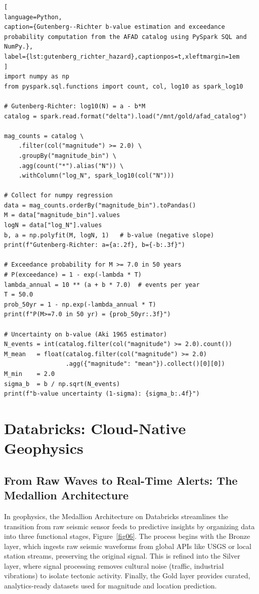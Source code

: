 \documentclass[data,article,accept,pdftex,moreauthors]{Definitions/mdpi}
\begin{document}

\begin{lstlisting}[
language=Python,
caption={Gutenberg--Richter b-value estimation and exceedance probability computation from the AFAD catalog using PySpark SQL and NumPy.},
label={lst:gutenberg_richter_hazard},captionpos=t,xleftmargin=1em
]
import numpy as np
from pyspark.sql.functions import count, col, log10 as spark_log10

# Gutenberg-Richter: log10(N) = a - b*M
catalog = spark.read.format("delta").load("/mnt/gold/afad_catalog")

mag_counts = catalog \
    .filter(col("magnitude") >= 2.0) \
    .groupBy("magnitude_bin") \
    .agg(count("*").alias("N")) \
    .withColumn("log_N", spark_log10(col("N")))

# Collect for numpy regression
data = mag_counts.orderBy("magnitude_bin").toPandas()
M = data["magnitude_bin"].values
logN = data["log_N"].values
b, a = np.polyfit(M, logN, 1)   # b-value (negative slope)
print(f"Gutenberg-Richter: a={a:.2f}, b={-b:.3f}")

# Exceedance probability for M >= 7.0 in 50 years
# P(exceedance) = 1 - exp(-lambda * T)
lambda_annual = 10 ** (a + b * 7.0)  # events per year
T = 50.0
prob_50yr = 1 - np.exp(-lambda_annual * T)
print(f"P(M>=7.0 in 50 yr) = {prob_50yr:.3f}")

# Uncertainty on b-value (Aki 1965 estimator)
N_events = int(catalog.filter(col("magnitude") >= 2.0).count())
M_mean   = float(catalog.filter(col("magnitude") >= 2.0)
                 .agg({"magnitude": "mean"}).collect()[0][0])
M_min    = 2.0
sigma_b  = b / np.sqrt(N_events)
print(f"b-value uncertainty (1-sigma): {sigma_b:.4f}")
\end{lstlisting}

\section{Databricks: Cloud-Native Geophysics}

\subsection{From Raw Waves to Real-Time Alerts: The Medallion Architecture}

In geophysics, the Medallion Architecture on Databricks streamlines the transition from raw seismic sensor feeds to predictive insights by organizing data into three functional stages, Figure~\ref{fig06}. The process begins with the Bronze layer, which ingests raw seismic waveforms from global APIs like USGS or local station streams, preserving the original signal. This is refined into the Silver layer, where signal processing removes cultural noise (traffic, industrial vibrations) to isolate tectonic activity. Finally, the Gold layer provides curated, analytics-ready datasets used for magnitude and location prediction.
\end{document}
